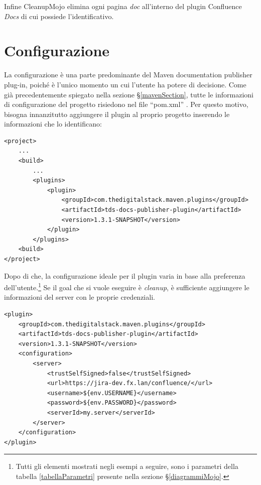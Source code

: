 Infine CleanupMojo elimina ogni pagina \emph{doc} all'interno del plugin Confluence \emph{Docs} di cui possiede l'identificativo.



\section{Configurazione} \label{configurazioneSec}
La configurazione è una parte predominante del Maven documentation publisher plug-in, poiché è l'unico momento un cui l'utente ha potere di decisione.
Come già precedentemente spiegato nella sezione \S\ref{mavenSection}, tutte le informazioni di configurazione del progetto risiedono nel file ``pom.xml'' \cite{site:maven-plugin-configurazione}.
Per questo motivo, bisogna innanzitutto aggiungere il plugin al proprio progetto inserendo le informazioni che lo identificano:

\begin{lstlisting} 
<project>
    ...
    <build>
        ...
        <plugins>
            <plugin>
                <groupId>com.thedigitalstack.maven.plugins</groupId>
                <artifactId>tds-docs-publisher-plugin</artifactId>
                <version>1.3.1-SNAPSHOT</version>
            </plugin>
        </plugins>
    <build>
</project>
\end{lstlisting}

Dopo di che, la configurazione ideale per il plugin varia in base alla preferenza dell'utente.\footnote{Tutti gli elementi mostrati negli esempi a seguire, sono i parametri della tabella \ref{tabellaParametri} presente nella sezione \S\ref{diagrammiMojo}.}
Se il goal che si vuole eseguire è \emph{cleanup}, è sufficiente aggiungere le informazioni del server con le proprie credenziali.

\begin{lstlisting}
<plugin>
    <groupId>com.thedigitalstack.maven.plugins</groupId>
    <artifactId>tds-docs-publisher-plugin</artifactId>
    <version>1.3.1-SNAPSHOT</version>
    <configuration>
        <server>
            <trustSelfSigned>false</trustSelfSigned>
            <url>https://jira-dev.fx.lan/confluence/</url>
            <username>${env.USERNAME}</username>
            <password>${env.PASSWORD}</password>
            <serverId>my.server</serverId>
        </server>
    </configuration>
</plugin>
\end{lstlisting}

